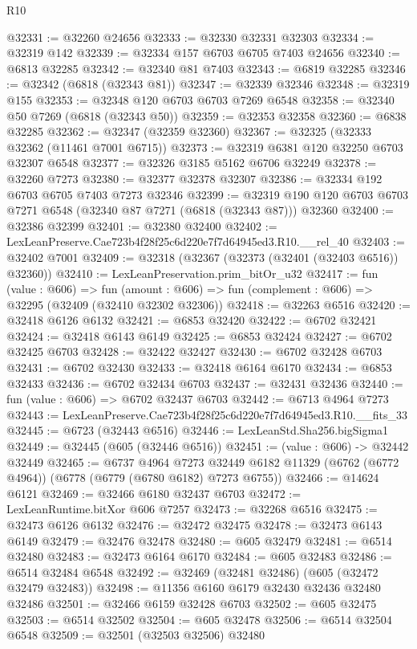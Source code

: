 \begin{lexlean}{R10}
\begin{coremodule}
@32331 := @32260 @24656
@32333 := @32330 @32331 @32303
@32334 := @32319 @142
@32339 := @32334 @157 @6703 @6705 @7403 @24656
@32340 := @6813 @32285
@32342 := @32340 @81 @7403
@32343 := @6819 @32285
@32346 := @32342 (@6818 (@32343 @81))
@32347 := @32339 @32346
@32348 := @32319 @155
@32353 := @32348 @120 @6703 @6703 @7269 @6548
@32358 := @32340 @50 @7269 (@6818 (@32343 @50))
@32359 := @32353 @32358
@32360 := @6838 @32285
@32362 := @32347 (@32359 @32360)
@32367 := @32325 (@32333 @32362 (@11461 @7001 @6715))
@32373 := @32319 @6381 @120 @32250 @6703 @32307 @6548
@32377 := @32326 @3185 @5162 @6706 @32249
@32378 := @32260 @7273
@32380 := @32377 @32378 @32307
@32386 := @32334 @192 @6703 @6705 @7403 @7273 @32346
@32399 := @32319 @190 @120 @6703 @6703 @7271 @6548 (@32340 @87 @7271 (@6818 (@32343 @87))) @32360
@32400 := @32386 @32399
@32401 := @32380 @32400
@32402 := LexLeanPreserve.Cae723b4f28f25c6d220e7f7d64945ed3.R10.__rel_40
@32403 := @32402 @7001
@32409 := @32318 (@32367 (@32373 (@32401 (@32403 @6516)) @32360))
@32410 := LexLeanPreservation.prim_bitOr_u32
@32417 := fun (value : @606) =>
  fun (amount : @606) => fun (complement : @606) => @32295 (@32409 (@32410 @32302 @32306))
@32418 := @32263 @6516
@32420 := @32418 @6126 @6132
@32421 := @6853 @32420
@32422 := @6702 @32421
@32424 := @32418 @6143 @6149
@32425 := @6853 @32424
@32427 := @6702 @32425 @6703
@32428 := @32422 @32427
@32430 := @6702 @32428 @6703
@32431 := @6702 @32430
@32433 := @32418 @6164 @6170
@32434 := @6853 @32433
@32436 := @6702 @32434 @6703
@32437 := @32431 @32436
@32440 := fun (value : @606) => @6702 @32437 @6703
@32442 := @6713 @4964 @7273
@32443 := LexLeanPreserve.Cae723b4f28f25c6d220e7f7d64945ed3.R10.__fits_33
@32445 := @6723 (@32443 @6516)
@32446 := LexLeanStd.Sha256.bigSigma1
@32449 := @32445 (@605 (@32446 @6516))
@32451 := (value : @606) -> @32442 @32449
@32465 := @6737
    @4964
    @7273
    @32449
    @6182
    @11329
    (@6762 (@6772 @4964))
    (@6778 (@6779 (@6780 @6182) @7273 @6755))
@32466 := @14624 @6121
@32469 := @32466 @6180 @32437 @6703
@32472 := LexLeanRuntime.bitXor @606 @7257
@32473 := @32268 @6516
@32475 := @32473 @6126 @6132
@32476 := @32472 @32475
@32478 := @32473 @6143 @6149
@32479 := @32476 @32478
@32480 := @605 @32479
@32481 := @6514 @32480
@32483 := @32473 @6164 @6170
@32484 := @605 @32483
@32486 := @6514 @32484 @6548
@32492 := @32469 (@32481 @32486) (@605 (@32472 @32479 @32483))
@32498 := @11356 @6160 @6179 @32430 @32436 @32480 @32486
@32501 := @32466 @6159 @32428 @6703
@32502 := @605 @32475
@32503 := @6514 @32502
@32504 := @605 @32478
@32506 := @6514 @32504 @6548
@32509 := @32501 (@32503 @32506) @32480

\end{coremodule}
\end{lexlean}
